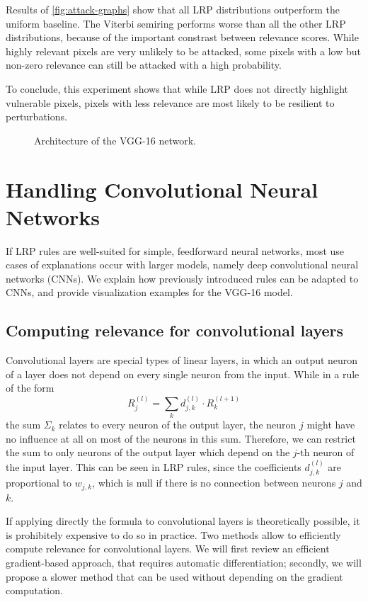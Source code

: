 \documentclass[twocolumn]{../cs-classes/cs-classes}
\newcommand*{\1}{\digitsbb{1}}
\newcommand*{\0}{\digitsbb{0}}
\begin{document}
Results of \autoref{fig:attack-graphs} show that all LRP distributions outperform the uniform baseline. The Viterbi semiring performs worse than all the other LRP distributions, because of the important constrast between relevance scores. While highly relevant pixels are very unlikely to be attacked, some pixels with a low but non-zero relevance can still be attacked with a high probability.

To conclude, this experiment shows that while LRP does not directly highlight vulnerable pixels, pixels with less relevance are most likely to be resilient to perturbations.


\begin{figure}
    \centering
    
    \caption{Architecture of the VGG-16 network.}
    \label{fig:vgg-architecture}
\end{figure}
\section{Handling Convolutional Neural Networks}
If LRP rules are well-suited for simple, feedforward neural networks, most use cases of explanations occur with larger models, namely deep convolutional neural networks (CNNs). We explain how previously introduced rules can be adapted to CNNs, and provide visualization examples for the VGG-16 model.

\subsection{Computing relevance for convolutional layers}
Convolutional layers are special types of linear layers, in which an output neuron of a layer does not depend on every single neuron from the input. While in a rule of the form
\begin{equation*}
    R_j^{(l)} = \sum_k d_{j, k}^{(l)} \cdot R_k^{(l+1)}
\end{equation*}
the sum $\Sigma_k$ relates to every neuron of the output layer, the neuron $j$ might have no influence at all on most of the neurons in this sum. Therefore, we can restrict the sum to only neurons of the output layer which depend on the $j$-th neuron of the input layer. This can be seen in LRP rules, since the coefficients $d_{j, k}^{(l)}$ are proportional to $w_{j,k}$, which is null if there is no connection between neurons $j$ and $k$. 

If applying directly the formula to convolutional layers is theoretically possible, it is prohibitely expensive to do so in practice. Two methods allow to efficiently compute relevance for convolutional layers. We will first review an efficient gradient-based approach, that requires automatic differentiation; secondly, we will propose a slower method that can be used without depending on the gradient computation.
\end{document}
